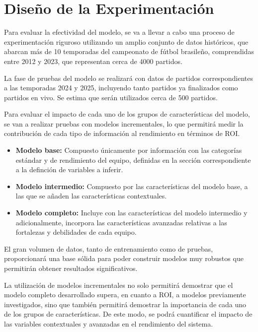 \section{Diseño de la Experimentación}

Para evaluar la efectividad del modelo, se va a llevar a cabo una proceso de experimentación riguroso utilizando un amplio conjunto de datos históricos, que abarcan más de 10 temporadas del campeonato de fútbol brasileño, comprendidas entre 2012 y 2023, que representan cerca de 4000 partidos. 

La fase de pruebas del modelo se realizará con datos de partidos correspondientes a las temporadas 2024 y 2025, incluyendo tanto partidos ya finalizados como partidos en vivo. Se estima que serán utilizados cerca de 500 partidos.

Para evaluar el impacto de cada uno de los grupos de características del modelo, se van a realizar pruebas con modelos incrementales, lo que permitirá medir la contribución de cada tipo de información al rendimiento en términos de ROI.

\begin{itemize}
    \item \textbf{Modelo base:} Compuesto únicamente por información con las categorías estándar y de rendimiento del equipo, definidas en la sección correspondiente a la definción de variables a inferir.
    \item \textbf{Modelo intermedio:} Compuesto por las características del modelo base, a las que se añaden las características contextuales.
    \item \textbf{Modelo completo:} Incluye con las características del modelo intermedio y adicionalmente, incorpora las características avanzadas relativas a las fortalezas y debilidades de cada equipo.
\end{itemize}


El gran volumen de datos, tanto de entrenamiento como de pruebas, proporcionará una base sólida para poder construir modelos muy robustos que permitirán obtener resultados significativos. 

La utilización de modelos incrementales no solo permitirá demostrar que el modelo completo desarrollado supera, en cuanto a ROI, a modelos previamente investigados, sino que también permitirá demostrar la importancia de cada uno de los grupos de características. De este modo, se podrá cuantificar el impacto de las variables contextuales y avanzadas en el rendimiento del sistema.